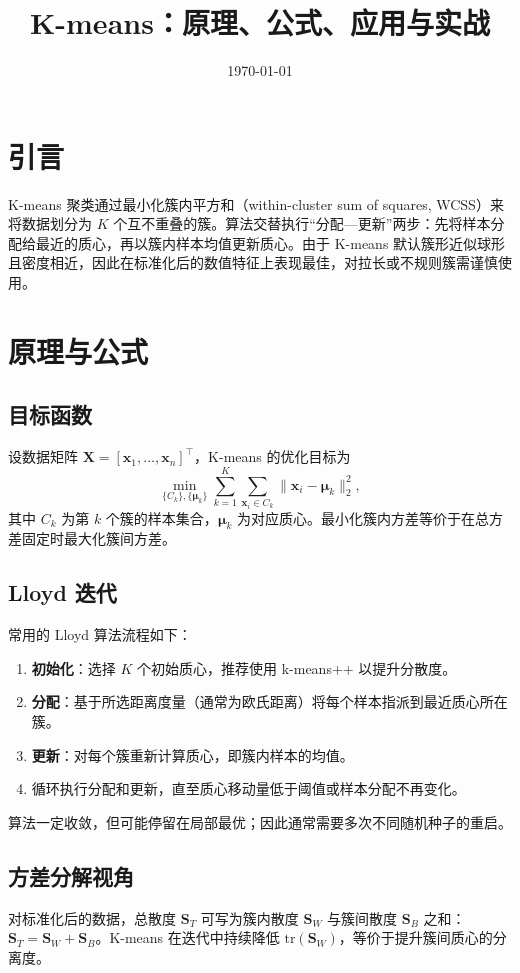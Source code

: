 \documentclass[UTF8,zihao=-4]{ctexart}
\title{K-means：原理、公式、应用与实战}
\author{}
\date{\today}
\begin{document}
\maketitle

\section{引言}
K-means 聚类通过最小化簇内平方和（within-cluster sum of squares, WCSS）来将数据划分为 \(K\) 个互不重叠的簇。算法交替执行“分配—更新”两步：先将样本分配给最近的质心，再以簇内样本均值更新质心。由于 K-means 默认簇形近似球形且密度相近，因此在标准化后的数值特征上表现最佳，对拉长或不规则簇需谨慎使用。

\section{原理与公式}
\subsection{目标函数}
设数据矩阵 \(\mathbf{X} = [\mathbf{x}_1,\dots,\mathbf{x}_n]^\top\)，K-means 的优化目标为
\begin{equation}
\min_{\{C_k\},\{\bm{\mu}_k\}} \sum_{k=1}^K \sum_{\mathbf{x}_i \in C_k} \lVert \mathbf{x}_i - \bm{\mu}_k \rVert_2^2,
\end{equation}
其中 \(C_k\) 为第 \(k\) 个簇的样本集合，\(\bm{\mu}_k\) 为对应质心。最小化簇内方差等价于在总方差固定时最大化簇间方差。

\subsection{Lloyd 迭代}
常用的 Lloyd 算法流程如下：
\begin{enumerate}
  \item \textbf{初始化}：选择 \(K\) 个初始质心，推荐使用 k-means++ 以提升分散度。
  \item \textbf{分配}：基于所选距离度量（通常为欧氏距离）将每个样本指派到最近质心所在簇。
  \item \textbf{更新}：对每个簇重新计算质心，即簇内样本的均值。
  \item 循环执行分配和更新，直至质心移动量低于阈值或样本分配不再变化。
\end{enumerate}
算法一定收敛，但可能停留在局部最优；因此通常需要多次不同随机种子的重启。

\subsection{方差分解视角}
对标准化后的数据，总散度 \(\mathbf{S}_T\) 可写为簇内散度 \(\mathbf{S}_W\) 与簇间散度 \(\mathbf{S}_B\) 之和：\(\mathbf{S}_T = \mathbf{S}_W + \mathbf{S}_B\)。K-means 在迭代中持续降低 \(\text{tr}(\mathbf{S}_W)\)，等价于提升簇间质心的分离度。
\end{document}
